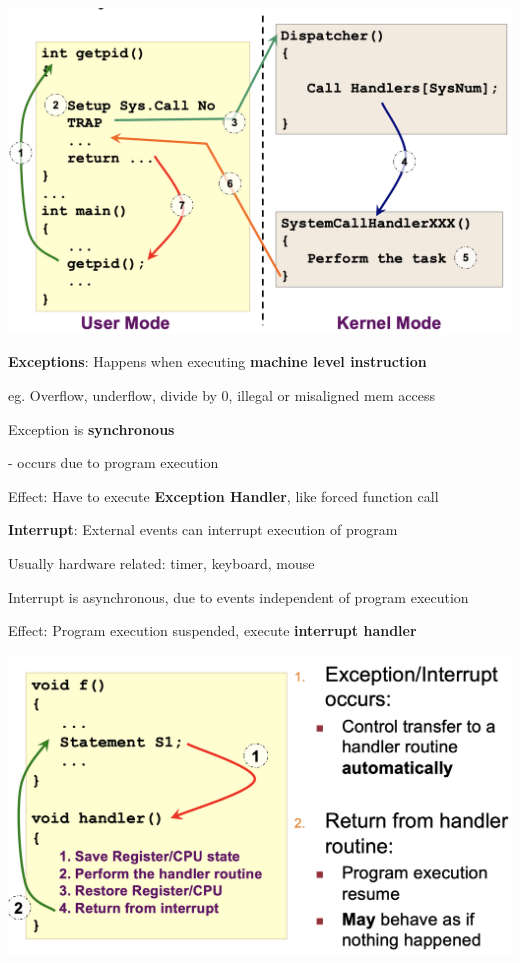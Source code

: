 \documentclass[10pt, a4paper]{article}
\newcommand{\highlight}[1]{{\color{red}\textbf{#1}}}
\newcommand{\blue}[1]{{\color{MidnightBlue}#1}}
\newcommand{\red}[1]{{\color{red}#1}}
\newcommand{\tab}[0]{\hspace*{2mm}}
\begin{document}
\begin{multicols*}{3}
		\includegraphics[scale=.24]{./assets/syscall.png}

		\textbf{Exceptions}: Happens when executing \textbf{machine level instruction}

		eg. Overflow, underflow, divide by 0, illegal or misaligned mem access

		Exception is \highlight{synchronous}

		\tab{} - occurs due to \red{program execution}
		
		Effect: Have to execute \highlight{Exception Handler}, like forced function call

		\textbf{Interrupt}: External events can interrupt execution of program

		Usually hardware related: timer, keyboard, mouse

		Interrupt is \red{asynchronous}, due to events \blue{independent} of program execution

		Effect: Program execution suspended, execute \textbf{interrupt handler}

		\includegraphics[scale=.25]{./assets/ExceptionInterrupt.png}


\end{multicols*}
\end{document}

